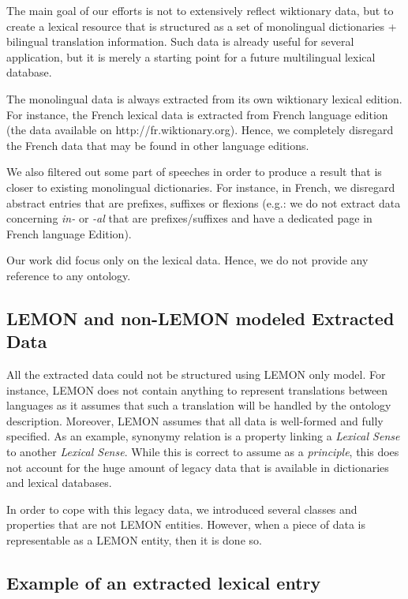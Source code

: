 \documentclass[sw]{iosart2c}
\begin{document}
The main goal of our efforts is not to extensively reflect wiktionary data, but to create a lexical resource that is structured as a set of monolingual dictionaries + bilingual translation information. Such data is already useful for several application, but it is merely a starting point for a future multilingual lexical database.

The monolingual data is always extracted from its own wiktionary lexical edition. For instance, the French lexical data is extracted from French language edition (the data available on http://fr.wiktionary.org). Hence, we completely disregard the French data that may be found in other language editions.

We also filtered out some part of speeches in order to produce a result that is closer to existing monolingual dictionaries. For instance, in French, we disregard abstract entries that are prefixes, suffixes or flexions (e.g.: we do not extract data concerning \textit{in-} or \textit{-al} that are prefixes/suffixes and have a dedicated page in French language Edition). 

Our work did focus only on the lexical data. Hence, we do not provide any reference to any ontology.  

\subsection{LEMON and non-LEMON modeled Extracted Data}

All the extracted data could not be structured using LEMON only model. For instance, LEMON does not contain anything to represent translations between languages as it assumes that such a translation will be handled by the ontology description. Moreover, LEMON assumes that all data is well-formed and fully specified. As an example, synonymy relation is a property linking a \textit{Lexical Sense} to another \textit{Lexical Sense}. While this is correct to assume as a \textit{principle}, this does not account for the huge amount of legacy data that is available in dictionaries and lexical databases.

In order to cope with this legacy data, we introduced several classes and properties that are not LEMON entities. However, when a piece of data is representable as a LEMON entity, then it is done so. 

\subsection{Example of an extracted lexical entry}
\end{document}
